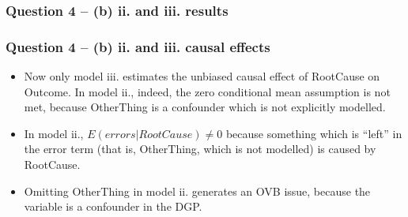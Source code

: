 \documentclass[xcolor=table]{beamer}
\begin{document}
\begin{frame}
\frametitle{Question 4 -- (b) ii. and iii. results}
\begin{table}[!htbp] 
\centering 
{}
\end{table} 
\end{frame}

\begin{frame}
\frametitle{Question 4 -- (b) ii. and iii. causal effects}
\begin{itemize}
\item Now only model iii. estimates the unbiased causal effect of RootCause on Outcome. In model ii., indeed, the zero conditional mean assumption is not met, because OtherThing is a confounder which is not explicitly modelled. \pause

\item In model ii., $E(errors|RootCause)\neq 0$ because something which is ``left'' in the error term (that is, OtherThing, which is not modelled) is caused by RootCause. \pause

\item Omitting OtherThing in model ii. generates an OVB issue, because the variable is a confounder in the DGP.
\end{itemize}
\end{frame}
\end{document}
